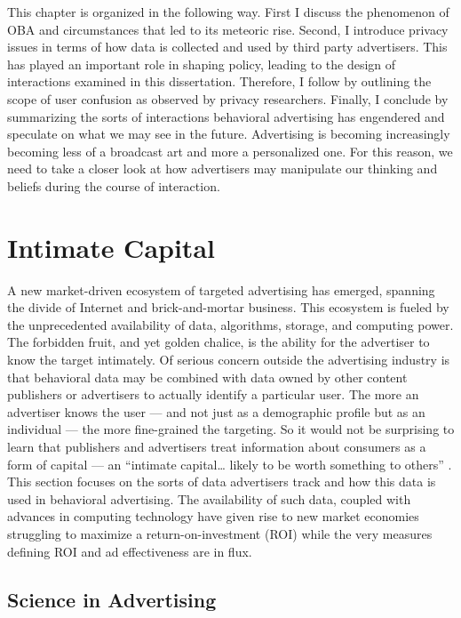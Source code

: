 This chapter is organized in the following way. First I discuss the phenomenon of OBA and circumstances that led to its meteoric rise. Second, I introduce privacy issues in terms of how data is collected and used by third party advertisers. This has played an important role in shaping policy, leading to the design of interactions examined in this dissertation. Therefore, I follow by outlining the scope of user confusion as observed by privacy researchers. Finally, I conclude by summarizing the sorts of interactions behavioral advertising has engendered and speculate on what we may see in the future. Advertising is becoming increasingly becoming less of a broadcast art and more a personalized one. For this reason, we need to take a closer look at how advertisers may manipulate our thinking and beliefs during the course of interaction.

\section{Intimate Capital}
\label{intimatecapital}

A new market-driven ecosystem of targeted advertising has emerged, spanning the divide of Internet and brick-and-mortar business. This ecosystem is fueled by the unprecedented availability of data, algorithms, storage, and computing power. The forbidden fruit, and yet golden chalice, is the ability for the advertiser to know the target intimately. Of serious concern outside the advertising industry is that behavioral data may be combined with data owned by other content publishers or advertisers to actually identify a particular user. The more an advertiser knows the user --- and not just as a demographic profile but as an individual --- the more fine-grained the targeting. So it would not be surprising to learn that publishers and advertisers treat information about consumers as a form of capital --- an ``intimate capital{\ldots} likely to be worth something to others''  \citep[p. 127]{Locke:2010wt}.  This section focuses on the sorts of data advertisers track and how this data is used in behavioral advertising. The availability of such data, coupled with advances in computing technology have given rise to new market economies struggling to maximize a return-on-investment (ROI) while the very measures defining ROI and ad effectiveness are in flux.

\subsection{Science in Advertising}
\label{scienceinadvertising}

